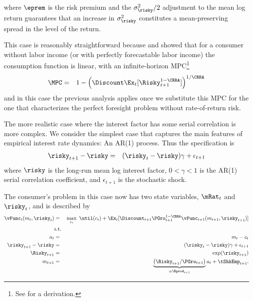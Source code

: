 \documentclass[titlepage]{\econtex}
\begin{document}
where $\eprem$ is the risk premium and the $\sigma^{2}_{\risky}/2$ adjustment to the mean log return
guarantees that an increase in $\sigma^{2}_{\risky}$ constitutes a mean-preserving spread in the level of the return.  

This case is reasonably straightforward because \cite{merton:restat} and \cite{samuelson:portfolio} showed
that for a consumer without labor income (or with perfectly forecastable labor income) the consumption
function is linear, with an infinite-horizon MPC\footnote{See  for a derivation.}
\begin{eqnarray}
  \MPC & = & 1- \left(\Discount  \Ex_{t}[\Risky_{t+1}^{1-\CRRA}]\right)^{1/\CRRA} \label{eq:MPCExact}
\end{eqnarray}
and in this case the previous analysis applies once we substitute this MPC for the one that characterizes 
the perfect foresight problem without rate-of-return risk.  

The more realistic case where the interest factor has some serial correlation is more complex.  We consider 
the simplest case that captures the main features of empirical interest rate dynamics: An AR(1) process.  Thus
the specification is 
\begin{eqnarray}
  \risky_{t+1}-\risky & = & (\risky_{t}-\risky) \gamma + \epsilon_{t+1} 
\end{eqnarray}
where $\risky$ is the long-run mean log interest factor, $0 < \gamma < 1$ is the AR(1) serial correlation
coefficient, and $\epsilon_{t+1}$ is the stochastic shock.  

The consumer's problem in this case now has two state variables, $\mRat_{t}$ and $\risky_{t}$, and 
is described by
\begin{eqnarray}
  \null{\vFunc}_{t}({m}_{t},\risky_{t}) & = & \max_{{c}_{t}} ~ \util({c}_{t})+
                                              \Ex_{t}[{\Discount}_{t+1}\PGro_{t+1}^{1-\CRRA}\null{\vFunc}_{t+1}({m}_{t+1},\risky_{t+1})] \label{vtNormRisky}
  \\         & \text{s.t.} &   \nonumber \\
  {a}_{t}   & = & {m}_{t}-{c}_{t} \nonumber
  \\      \risky_{t+1}-\risky & = & (\risky_{t}-\risky)\gamma + \epsilon_{t+1} \notag
  \\      \Risky_{t+1} & = & \exp(\risky_{t+1}) \notag
  \\      {m}_{t+1} & = & \underbrace{\left(\Risky_{t+1}/\PGro_{t+1}\right)}_{\equiv \Rprod_{t+1}}{a}_{t}+\tShkEmp_{t+1} \nonumber.
\end{eqnarray}
\end{document}
